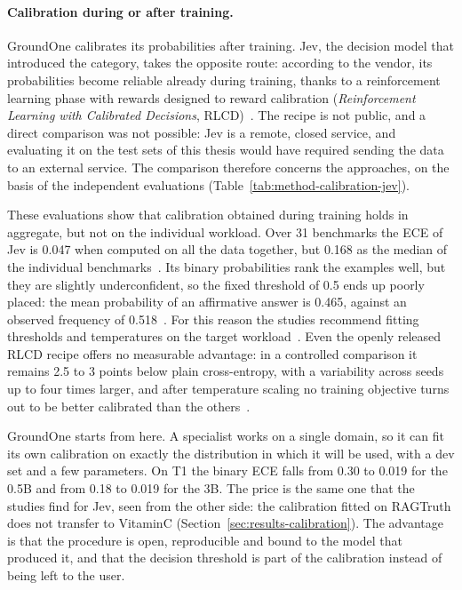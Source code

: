 \paragraph{Calibration during or after training.} GroundOne calibrates its probabilities after training. Jev, the
decision model that introduced the category, takes the opposite route: according to the vendor, its probabilities
become reliable already during training, thanks to a reinforcement learning phase with rewards designed to reward
calibration (\emph{Reinforcement Learning with Calibrated Decisions}, RLCD)~\cite{typesafe2026jev}. The recipe is not
public, and a direct comparison was not possible: Jev is a remote, closed service, and evaluating it on the test sets
of this thesis would have required sending the data to an external service. The comparison therefore concerns the
approaches, on the basis of the independent evaluations (Table~\ref{tab:method-calibration-jev}).

These evaluations show that calibration obtained during training holds in aggregate, but not on the individual
workload. Over 31 benchmarks the ECE of Jev is 0.047 when computed on all the data together, but 0.168 as the median of
the individual benchmarks~\cite{guo2026justaskjev}. Its binary probabilities rank the examples well, but they are
slightly underconfident, so the fixed threshold of 0.5 ends up poorly placed: the mean probability of an affirmative
answer is 0.465, against an observed frequency of 0.518~\cite{deusser2026jev}. For this reason the studies recommend
fitting thresholds and temperatures on the target workload~\cite{li2026jevjudge}. Even the openly released RLCD recipe
offers no measurable advantage: in a controlled comparison it remains 2.5 to 3 points below plain cross-entropy, with a
variability across seeds up to four times larger, and after temperature scaling no training objective turns out to be
better calibrated than the others~\cite{deka2026typed}.

GroundOne starts from here. A specialist works on a single domain, so it can fit its own calibration on exactly the
distribution in which it will be used, with a dev set and a few parameters. On T1 the binary ECE falls from 0.30 to
0.019 for the 0.5B and from 0.18 to 0.019 for the 3B. The price is the same one that the studies find for Jev, seen
from the other side: the calibration fitted on RAGTruth does not transfer to VitaminC
(Section~\ref{sec:results-calibration}). The advantage is that the procedure is open, reproducible and bound to the
model that produced it, and that the decision threshold is part of the calibration instead of being left to the user.

